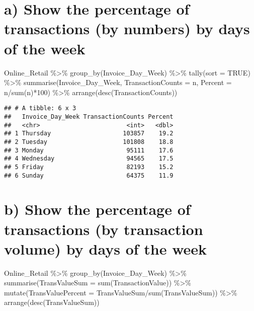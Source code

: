 \documentclass[
]{article}
\newenvironment{Shaded}{\begin{snugshade}}{\end{snugshade}}
\newcommand{\AttributeTok}[1]{\textcolor[rgb]{0.77,0.63,0.00}{#1}}
\newcommand{\ConstantTok}[1]{\textcolor[rgb]{0.00,0.00,0.00}{#1}}
\newcommand{\DecValTok}[1]{\textcolor[rgb]{0.00,0.00,0.81}{#1}}
\newcommand{\FunctionTok}[1]{\textcolor[rgb]{0.00,0.00,0.00}{#1}}
\newcommand{\NormalTok}[1]{#1}
\newcommand{\SpecialCharTok}[1]{\textcolor[rgb]{0.00,0.00,0.00}{#1}}
\begin{document}
\hypertarget{a-show-the-percentage-of-transactions-by-numbers-by-days-of-the-week}{%
\section{a) Show the percentage of transactions (by numbers) by days of
the
week}\label{a-show-the-percentage-of-transactions-by-numbers-by-days-of-the-week}}

\begin{Shaded}
\begin{Highlighting}[]
\NormalTok{Online\_Retail }\SpecialCharTok{\%\textgreater{}\%}  
  \FunctionTok{group\_by}\NormalTok{(Invoice\_Day\_Week) }\SpecialCharTok{\%\textgreater{}\%} 
  \FunctionTok{tally}\NormalTok{(}\AttributeTok{sort =} \ConstantTok{TRUE}\NormalTok{) }\SpecialCharTok{\%\textgreater{}\%} 
  \FunctionTok{summarise}\NormalTok{(Invoice\_Day\_Week, }\AttributeTok{TransactionCounts =}\NormalTok{ n, }\AttributeTok{Percent =}\NormalTok{ n}\SpecialCharTok{/}\FunctionTok{sum}\NormalTok{(n)}\SpecialCharTok{*}\DecValTok{100}\NormalTok{) }\SpecialCharTok{\%\textgreater{}\%} 
  \FunctionTok{arrange}\NormalTok{(}\FunctionTok{desc}\NormalTok{(TransactionCounts))}
\end{Highlighting}
\end{Shaded}

\begin{verbatim}
## # A tibble: 6 x 3
##   Invoice_Day_Week TransactionCounts Percent
##   <chr>                        <int>   <dbl>
## 1 Thursday                    103857    19.2
## 2 Tuesday                     101808    18.8
## 3 Monday                       95111    17.6
## 4 Wednesday                    94565    17.5
## 5 Friday                       82193    15.2
## 6 Sunday                       64375    11.9
\end{verbatim}

\hypertarget{b-show-the-percentage-of-transactions-by-transaction-volume-by-days-of-the-week}{%
\section{b) Show the percentage of transactions (by transaction volume)
by days of the
week}\label{b-show-the-percentage-of-transactions-by-transaction-volume-by-days-of-the-week}}

\begin{Shaded}
\begin{Highlighting}[]
\NormalTok{Online\_Retail }\SpecialCharTok{\%\textgreater{}\%} 
  \FunctionTok{group\_by}\NormalTok{(Invoice\_Day\_Week) }\SpecialCharTok{\%\textgreater{}\%} 
  \FunctionTok{summarise}\NormalTok{(}\AttributeTok{TransValueSum =} \FunctionTok{sum}\NormalTok{(TransactionValue)) }\SpecialCharTok{\%\textgreater{}\%}
  \FunctionTok{mutate}\NormalTok{(}\AttributeTok{TransValuePercent =}\NormalTok{ TransValueSum}\SpecialCharTok{/}\FunctionTok{sum}\NormalTok{(TransValueSum)) }\SpecialCharTok{\%\textgreater{}\%} 
  \FunctionTok{arrange}\NormalTok{(}\FunctionTok{desc}\NormalTok{(TransValueSum))}
\end{Highlighting}
\end{Shaded}
\end{document}
